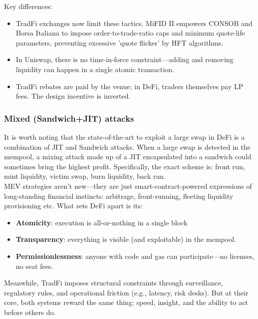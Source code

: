\documentclass[a4paper,11pt]{article}
\begin{document}
Key differences:
\begin{itemize}
    \item TradFi exchanges now limit these tactics. MiFID II empowers CONSOB and Borsa Italiana to impose order-to-trade-ratio caps and minimum quote-life parameters, preventing excessive 'quote flicker' by HFT algorithms.
    \item In Uniswap, there is no time-in-force constraint—adding and removing liquidity can happen in a single atomic transaction.
    \item TradFi rebates are paid by the venue; in DeFi, traders themselves pay LP fees. The design incentive is inverted.
\end{itemize}



\subsubsection{Mixed (Sandwich+JIT) attacks}
It is worth noting that the state-of-the-art to exploit a large swap in DeFi is a combination of JIT and Sandwich attacks. When a large swap is detected in the mempool, a mixing attack made up of a JIT encapsulated into a sandwich could sometimes bring the highest profit. Specifically, the exact scheme is: front run, mint liquidity, victim swap, burn liquidity, back run.\\


\noindent MEV strategies aren’t new—they are just smart-contract-powered expressions of long-standing financial instincts: arbitrage, front-running, fleeting liquidity provisioning etc. What sets DeFi apart is its:
\begin{itemize}
    \item \textbf{Atomicity}: execution is all-or-nothing in a single block
    \item \textbf{Transparency}: everything is visible (and exploitable) in the mempool.
    \item \textbf{Permissionlessness}: anyone with code and gas can participate—no licenses, no seat fees.
\end{itemize}

Meanwhile, TradFi imposes structural constraints through surveillance, regulatory rules, and operational friction (e.g., latency, risk desks). But at their core, both systems reward the same thing: speed, insight, and the ability to act before others do. 
\end{document}
